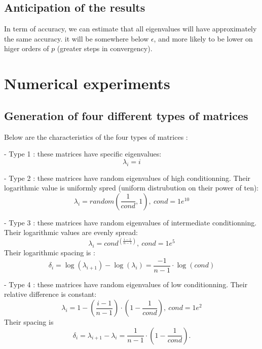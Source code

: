 \documentclass{article}
\begin{document}
\subsection{Anticipation of the results}

In term of accuracy, we can estimate that all eigenvalues will have approximately the same accuracy. it will be somewhere below $\epsilon$, and more likely to be lower on higer orders of $p$ (greater steps in convergency).

\section*{Numerical experiments}

\subsection{Generation of four different types of matrices}

Below are the characteristics of the four types of matrices :

- Type 1 : these matrices have specific eigenvalues:
\begin{equation}
    \lambda_i = i
\end{equation}

- Type 2 : these matrices have random eigenvalues of high conditionning. Their logarithmic value is uniformly spred (uniform distrubution on their power of ten):
\begin{equation}
    \lambda_i = random(\frac{1}{cond}, 1) ,\ cond = 1e^{10}
\end{equation}



- Type 3 : these matrices have random eigenvalues of intermediate conditionning. Their logarithmic values are evenly spread:
\begin{equation}
    \lambda_i = cond^{(\frac{i-1}{n-1})},\ cond = 1e^{5}
\end{equation}
Their logarithmic spacing is :
\begin{equation}
    \delta_i = \log(\lambda_{i+1})-\log(\lambda_i) = \frac{-1}{n-1} \cdot \log(cond)
\end{equation}



- Type 4 : these matrices have random eigenvalues of low conditionning. Their relative difference is constant:
\begin{equation}
    \lambda_i = 1- (\frac{i-1}{n-1}) \cdot (1-\frac{1}{cond}) ,\ cond = 1e^{2}
\end{equation}
Their spacing is
\begin{equation}
    \delta_i = \lambda_{i+1}-\lambda_i = \frac{1}{n-1} \cdot (1-\frac{1}{cond}).
\end{equation}
\end{document}
